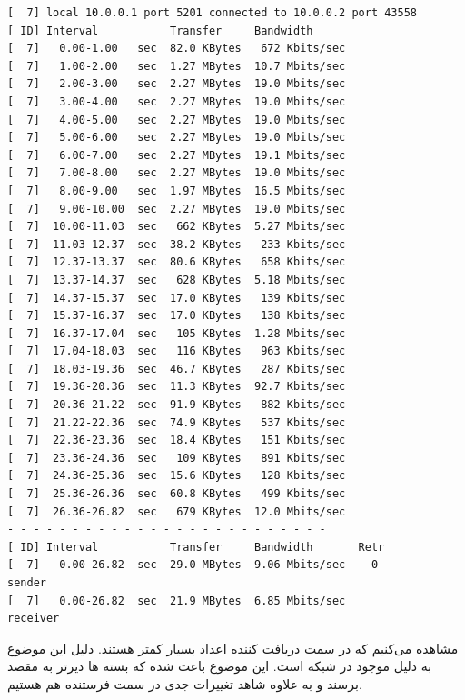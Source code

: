 \documentclass[12pt]{article}
\begin{document}
\begin{enumerate}
\begin{latin}
	\begin{Verbatim}
[  7] local 10.0.0.1 port 5201 connected to 10.0.0.2 port 43558
[ ID] Interval           Transfer     Bandwidth
[  7]   0.00-1.00   sec  82.0 KBytes   672 Kbits/sec                  
[  7]   1.00-2.00   sec  1.27 MBytes  10.7 Mbits/sec                  
[  7]   2.00-3.00   sec  2.27 MBytes  19.0 Mbits/sec                  
[  7]   3.00-4.00   sec  2.27 MBytes  19.0 Mbits/sec                  
[  7]   4.00-5.00   sec  2.27 MBytes  19.0 Mbits/sec                  
[  7]   5.00-6.00   sec  2.27 MBytes  19.0 Mbits/sec                  
[  7]   6.00-7.00   sec  2.27 MBytes  19.1 Mbits/sec                  
[  7]   7.00-8.00   sec  2.27 MBytes  19.0 Mbits/sec                  
[  7]   8.00-9.00   sec  1.97 MBytes  16.5 Mbits/sec                  
[  7]   9.00-10.00  sec  2.27 MBytes  19.0 Mbits/sec                  
[  7]  10.00-11.03  sec   662 KBytes  5.27 Mbits/sec                  
[  7]  11.03-12.37  sec  38.2 KBytes   233 Kbits/sec                  
[  7]  12.37-13.37  sec  80.6 KBytes   658 Kbits/sec                  
[  7]  13.37-14.37  sec   628 KBytes  5.18 Mbits/sec                  
[  7]  14.37-15.37  sec  17.0 KBytes   139 Kbits/sec                  
[  7]  15.37-16.37  sec  17.0 KBytes   138 Kbits/sec                  
[  7]  16.37-17.04  sec   105 KBytes  1.28 Mbits/sec                  
[  7]  17.04-18.03  sec   116 KBytes   963 Kbits/sec                  
[  7]  18.03-19.36  sec  46.7 KBytes   287 Kbits/sec                  
[  7]  19.36-20.36  sec  11.3 KBytes  92.7 Kbits/sec                  
[  7]  20.36-21.22  sec  91.9 KBytes   882 Kbits/sec                  
[  7]  21.22-22.36  sec  74.9 KBytes   537 Kbits/sec                  
[  7]  22.36-23.36  sec  18.4 KBytes   151 Kbits/sec                  
[  7]  23.36-24.36  sec   109 KBytes   891 Kbits/sec                  
[  7]  24.36-25.36  sec  15.6 KBytes   128 Kbits/sec                  
[  7]  25.36-26.36  sec  60.8 KBytes   499 Kbits/sec                  
[  7]  26.36-26.82  sec   679 KBytes  12.0 Mbits/sec                  
- - - - - - - - - - - - - - - - - - - - - - - - -
[ ID] Interval           Transfer     Bandwidth       Retr
[  7]   0.00-26.82  sec  29.0 MBytes  9.06 Mbits/sec    0             sender
[  7]   0.00-26.82  sec  21.9 MBytes  6.85 Mbits/sec                  receiver

	\end{Verbatim}
\end{latin}

مشاهده می‌کنیم که در سمت دریافت کننده اعداد  بسیار کمتر هستند. دلیل این موضوع به دلیل  موجود در شبکه است. این موضوع باعث شده که بسته ها دیرتر به مقصد برسند و به علاوه شاهد تغییرات جدی در  سمت فرستنده هم هستیم.


\end{enumerate}
\end{document}
